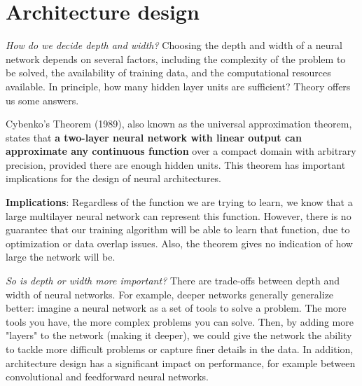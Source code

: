 \section{Architecture design}
\textit{How do we decide depth and width?} Choosing the depth and width of a neural network depends on several factors, including the complexity of the problem to be solved, the availability of training data, and the computational resources available. In principle, how many hidden layer units are sufficient? Theory offers us some answers.

\begin{remark}
Cybenko's Theorem (1989), also known as the universal approximation theorem, states that \textbf{a two-layer neural network with linear output can approximate any continuous function} over a compact domain with arbitrary precision, provided there are enough hidden units. This theorem has important implications for the design of neural architectures.
\end{remark}

\textbf{Implications}: Regardless of the function we are trying to learn, we know that a large multilayer neural network can represent this function. However, there is no guarantee that our training algorithm will be able to learn that function, due to optimization or data overlap issues. Also, the theorem gives no indication of how large the network will be.

\textit{So is depth or width more important?} There are trade-offs between depth and width of neural networks. For example, deeper networks generally generalize better: imagine a neural network as a set of tools to solve a problem. The more tools you have, the more complex problems you can solve. Then, by adding more "layers" to the network (making it deeper), we could give the network the ability to tackle more difficult problems or capture finer details in the data. In addition, architecture design has a significant impact on performance, for example between convolutional and feedforward neural networks.